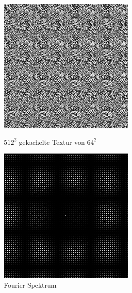 \label{pic:tiled blue noise}
\begin{figure}[H]
    \centering
    \begin{minipage}[t]{0.45\linewidth}
        \centering
        \includegraphics[width=\linewidth]{content/BlueNoise/Bilder/tiled4times.png}
        \caption{$512^{2}$ gekachelte Textur von $64^{2}$}
    \end{minipage}
    \hfill
    \begin{minipage}[t]{0.45\linewidth}
        \centering
        \includegraphics[width=\linewidth]{content/BlueNoise/Bilder/FFTtiled4times.png}
        \caption{Fourier Spektrum}
    \end{minipage}
\end{figure}

